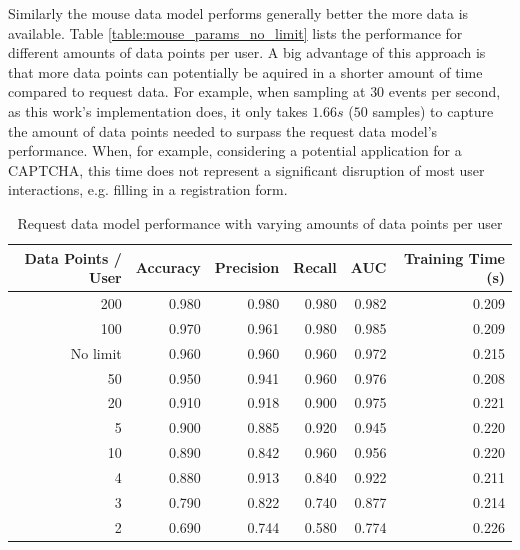 \documentclass[
    fontsize=12pt,
    headings=small,
    parskip=half,           %
    bibliography=totoc,
    numbers=noenddot,       %
    open=any,               %
    final,                   %
    table
]{scrreprt}
\begin{document}
Similarly the mouse data model performs generally better the more data is available. Table \ref{table:mouse_params_no_limit} lists the performance for different amounts of data points per user. A big advantage of this approach is that more data points can potentially be aquired in a shorter amount of time compared to request data. For example, when sampling at $30$ events per second, as this work's implementation does, it only takes $1.66s$ ($50$ samples) to capture the amount of data points needed to surpass the request data model's performance. When, for example, considering a potential application for a CAPTCHA, this time does not represent a significant disruption of most user interactions, e.g. filling in a registration form.

\begin{table}[H]
    \begin{center}
        \begin{tabular}{rrrrrr}
            \toprule
            Data Points / User & Accuracy & Precision & Recall & AUC & Training Time (s) \\
            \midrule
            200 & 0.980 & 0.980 & 0.980 & 0.982 & 0.209 \\
            100 & 0.970 & 0.961 & 0.980 & 0.985 & 0.209 \\
            No limit & 0.960 & 0.960 & 0.960 & 0.972 & 0.215 \\
            50 & 0.950 & 0.941 & 0.960 & 0.976 & 0.208 \\
            20 & 0.910 & 0.918 & 0.900 & 0.975 & 0.221 \\
            5 & 0.900 & 0.885 & 0.920 & 0.945 & 0.220 \\
            10 & 0.890 & 0.842 & 0.960 & 0.956 & 0.220 \\
            4 & 0.880 & 0.913 & 0.840 & 0.922 & 0.211 \\
            3 & 0.790 & 0.822 & 0.740 & 0.877 & 0.214 \\
            2 & 0.690 & 0.744 & 0.580 & 0.774 & 0.226 \\
            \bottomrule
        \end{tabular}
    \end{center}
    \caption{Request data model performance with varying amounts of data points per user}
    \label{table:request_params_no_limit}
\end{table}
\end{document}
